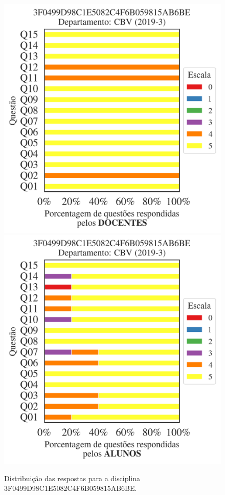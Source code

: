 \documentclass[a4paper,10pt]{article}
\begin{document}
\begin{figure}[h]
\centering
\includegraphics[width=0.485\linewidth]{analise_disciplina_departamento_CBV_3F0499D98C1E5082C4F6B059815AB6BE_docentes.png}
\includegraphics[width=0.485\linewidth]{analise_disciplina_departamento_CBV_3F0499D98C1E5082C4F6B059815AB6BE_alunos.png}
\caption{\label{fig:analise_geral_departamento}                Distribuição das respostas para a disciplina 3F0499D98C1E5082C4F6B059815AB6BE. }
\end{figure}
\end{document}
